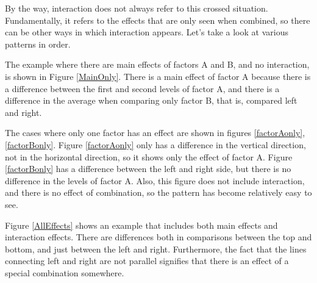 \documentclass{ltjbook}
\begin{document}


By the way, interaction does not always refer to this crossed situation. Fundamentally, it refers to the effects that are only seen when combined, so there can be other ways in which interaction appears. Let's take a look at various patterns in order.

The example where there are main effects of factors A and B, and no interaction, is shown in Figure \ref{MainOnly}. There is a main effect of factor A because there is a difference between the first and second levels of factor A, and there is a difference in the average when comparing only factor B, that is, compared left and right.


The cases where only one factor has an effect are shown in figures \ref{factorAonly},\ref{factorBonly}. Figure \ref{factorAonly} only has a difference in the vertical direction, not in the horizontal direction, so it shows only the effect of factor A. Figure \ref{factorBonly} has a difference between the left and right side, but there is no difference in the levels of factor A. Also, this figure does not include interaction, and there is no effect of combination, so the pattern has become relatively easy to see.

Figure \ref{AllEffects} shows an example that includes both main effects and interaction effects. There are differences both in comparisons between the top and bottom, and just between the left and right. Furthermore, the fact that the lines connecting left and right are not parallel signifies that there is an effect of a special combination somewhere.
\end{document}
